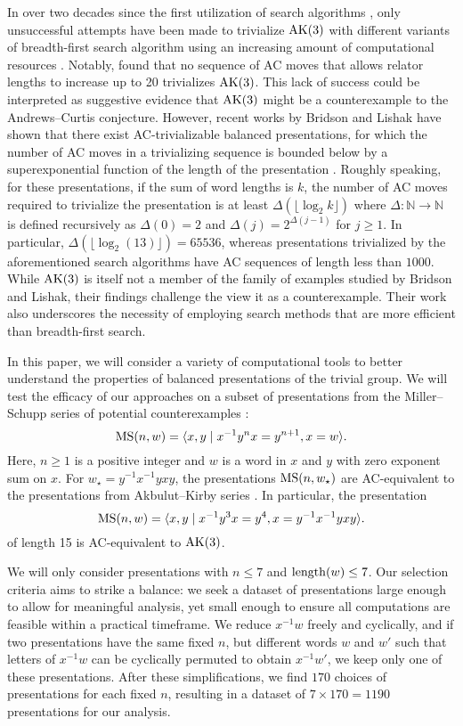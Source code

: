 In over two decades since the first utilization of search algorithms \cite{genetic, bfs-ac}, only unsuccessful attempts have been made to trivialize $\text{AK}(3)$ with different variants of breadth-first search algorithm using an increasing amount of computational resources \cite{Bowman-McCaul, krawiec2016distance, Panteleev-Ushakov}.
Notably, \cite{Panteleev-Ushakov} found that no sequence of AC moves that allows relator lengths to increase up to 20 trivializes $\text{AK}(3)$.
This lack of success could be interpreted as suggestive evidence that $\text{AK}(3)$ might be a counterexample to the Andrews--Curtis conjecture.
However, recent works by Bridson and Lishak have shown that there exist AC-trivializable balanced presentations, for which the number of AC moves in a trivializing sequence is bounded below by a superexponential function of the length of the presentation \cite{Bridson, Lishak}.
Roughly speaking, for these presentations, if the sum of word lengths is $k$, the number of AC moves required to trivialize the presentation is at least $\Delta (\lfloor \log_2 k \rfloor)$ where $\Delta \colon \mathbb{N} \to \mathbb{N}$ is defined recursively as $\Delta(0) = 2$ and $\Delta (j) = 2^{\Delta(j-1)}$ for $j \geq 1$.
In particular, $\Delta (\lfloor \log_2 (13) \rfloor) = 65536$, whereas presentations trivialized by the aforementioned search algorithms have AC sequences of length less than $1000$.
While $\text{AK}(3)$ is itself not a member of the family of examples studied by Bridson and Lishak, their findings challenge the view it as a counterexample.
Their work also underscores the necessity of employing search methods that are more efficient than breadth-first search.

In this paper, we will consider a variety of computational tools to better understand the properties of balanced presentations of the trivial group.
We will test the efficacy of our approaches on a subset of presentations from the Miller--Schupp series of potential counterexamples \cite{Miller--Schupp}:
\[
\text{MS}(n, w) = \langle x, y \mid x^{-1} y^n x = y^{n+1}, x = w\rangle.
\]
Here, $n \ge 1$ is a positive integer and $w$ is a word in $x$ and $y$ with zero exponent sum on $x$.
For $w_\star = y^{-1} x^{-1} y x y$, the presentations $\text{MS}(n, w_\star)$ are AC-equivalent to the presentations from Akbulut--Kirby series \cite{MMS}.
In particular, the presentation
\[
\text{MS}(n, w) = \langle x, y \mid x^{-1} y^3 x = y^{4}, x =  y^{-1} x^{-1} y x y\rangle.
\]
of length 15 is AC-equivalent to $\text{AK}(3)$.

We will only consider presentations with $n \leq 7$ and $\operatorname{length}(w) \leq 7$.
Our selection criteria aims to strike a balance: we seek a dataset of presentations large enough to allow for meaningful analysis, yet small enough to ensure all computations are feasible within a practical timeframe.
We reduce $x^{-1}w$ freely and cyclically, and if two presentations have the same fixed $n$, but different words $w$ and $w'$ such that letters of $x^{-1} w$ can be cyclically permuted to obtain $x^{-1} w'$, we keep only one of these presentations.
After these simplifications, we find $170$ choices of presentations for each fixed $n$, resulting in a dataset of $7 \times 170 = 1190$ presentations for our analysis.


